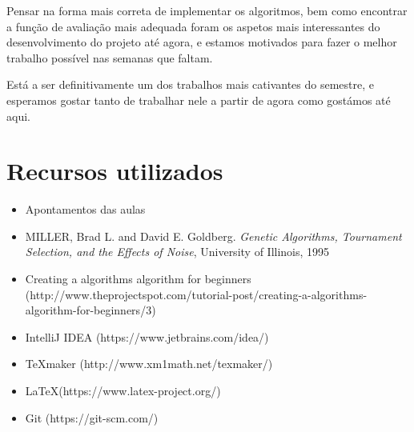 \documentclass[11pt,a4paper,reqno]{article}
\numberwithin{equation}{section}
\begin{document}
Pensar na forma mais correta de implementar os algoritmos, bem como encontrar a função de avaliação mais adequada foram os aspetos mais interessantes do desenvolvimento do projeto até agora, e estamos motivados para fazer o melhor trabalho possível nas semanas que faltam.

Está a ser definitivamente um dos trabalhos mais cativantes do semestre, e esperamos gostar tanto de trabalhar nele a partir de agora como gostámos até aqui.


\newpage

\section{Recursos utilizados}

\begin{itemize}
\item Apontamentos das aulas
\item MILLER, Brad L. and David E. Goldberg. \textit{Genetic Algorithms, Tournament Selection, and the Effects of Noise}, University of Illinois, 1995\item Creating a algorithms algorithm for beginners (http://www.theprojectspot.com/tutorial-post/creating-a-algorithms-algorithm-for-beginners/3)
\item IntelliJ IDEA (https://www.jetbrains.com/idea/)
\item TeXmaker (http://www.xm1math.net/texmaker/)
\item LaTeX(https://www.latex-project.org/)
\item Git (https://git-scm.com/)

\end{itemize}
\end{document}
